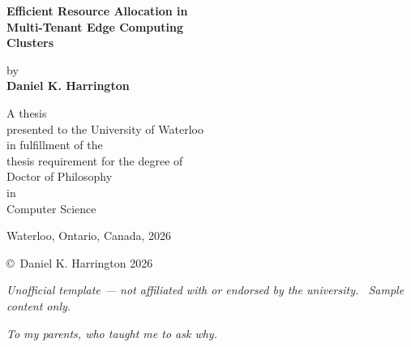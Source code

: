 \documentclass[12pt,letterpaper,twoside]{report}
\begin{document}
\thispagestyle{empty}
\begin{center}

\vspace*{36pt}

{\Huge\bfseries\color{uwaterlooNavy} Efficient Resource Allocation in\\[6pt]
Multi-Tenant Edge Computing\\[6pt]
Clusters}

\vspace{24pt}

{\Large by}\\[12pt]
{\Large\bfseries Daniel K. Harrington}

\vspace{36pt}


\vspace{28pt}

{\large A thesis}\\[6pt]
{\large presented to the University of Waterloo}\\[6pt]
{\large in fulfillment of the}\\[6pt]
{\large thesis requirement for the degree of}\\[6pt]
{\large Doctor of Philosophy}\\[6pt]
{\large in}\\[6pt]
{\large Computer Science}

\vspace{28pt}

{\large Waterloo, Ontario, Canada, 2026}

\vspace{28pt}

{\raggedright\footnotesize\color{accentSlate}%
\copyright\ Daniel K. Harrington 2026}

\vspace{16pt}

{\tiny\color{accentSlate}\itshape
Unofficial template --- not affiliated with or endorsed by the university.%
\ Sample content only.}

\end{center}

\newpage
\thispagestyle{empty}
\vspace*{\fill}
\begin{center}
{\large\itshape To my parents, who taught me to ask why.}
\end{center}
\vspace*{\fill}
\newpage
\end{document}
